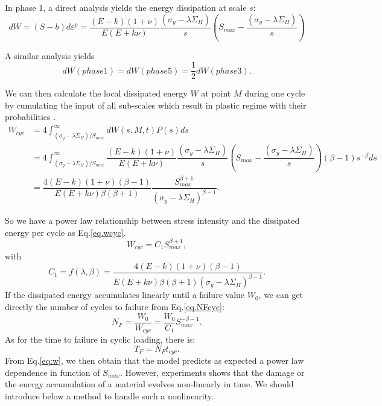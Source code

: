 \documentclass[3p,times,number,review]{elsarticle}
\begin{document}
In phase 1, a direct analysis yields the energy dissipation at scale $s$:
\begin{equation}dW=(S-b)d\varepsilon^p=\dfrac{(E-k)(1+\nu) }{E(E+k\nu)}\dfrac{ \left(\sigma_y-\lambda \Sigma_H\right)}{s}\left(S_{max}-\dfrac{ \left(\sigma_y-\lambda \Sigma_H\right)}{s}\right)
\label{dw}
\end{equation}

A similar analysis yields $$dW(phase 1)=dW(phase 5)=\dfrac{1}{2}dW(phase 3).$$

We can then calculate  the local dissipated energy $W$  at point $M$ during one cycle by cumulating the input of all sub-scales which result in plastic regime with their probabilities \cite{zepeng}.
\begin{equation}
\begin{split}
W_{cyc}&=4\int_{ \left(\sigma_y-\lambda \Sigma_H\right) /S_{max}}^{\infty}dW(s,M,t)P(s)ds
\\&=4\int_{ \left(\sigma_y-\lambda \Sigma_H\right) /S_{max}}^{\infty}\dfrac{(E-k)(1+\nu) }{E(E+k\nu)}\dfrac{ \left(\sigma_y-\lambda \Sigma_H\right)}{s}\left(S_{max}-\dfrac{ \left(\sigma_y-\lambda \Sigma_H\right)}{s}\right)\left( \beta-1\right) s^{-\beta}ds
\\&=\dfrac{4(E-k)(1+\nu)\left( \beta-1\right) }{ E(E+k\nu)\beta\left( \beta+1\right) }\dfrac{S_{max}^{\beta+1}}{ \left(\sigma_y-\lambda \Sigma_H\right)^{\beta-1}}.
\end{split}
\label{eq:w}
\end{equation}

So we have a power law relationship between stress intensity and the dissipated energy per cycle as Eq.\eqref{eq.wcyc}.
\begin{equation}
W_{cyc}=C_1S_{max}^{\beta+1},
\label{eq.wcyc}
\end{equation}
with 
$$C_1=f(\lambda,\beta)=\dfrac{4(E-k)(1+\nu)\left( \beta-1\right) }{ E(E+k\nu)\beta\left( \beta+1\right)\left(\sigma_y-\lambda \Sigma_H\right)^{\beta-1} }.$$
 If the dissipated energy accumulates linearly until a failure value $W_0$, we can get directly the number of cycles to failure from Eq.\eqref{eq.NFcyc}:
\begin{equation}
N_{F}=\dfrac{W_0}{W_{cyc}}=\dfrac{W_0}{C_1}S_{max}^{-\beta-1}.
\label{eq.NFcyc}
\end{equation}
As for the time to failure in cyclic loading, there is:
$$T_{F}=N_{F}t_{cyc}.$$
From Eq.\eqref{eq:w}, we then obtain that the model predicts as expected a power law dependence in function of $S_{max}$.
However, experiments shows that the damage or the energy accumulation of a material evolves non-linearly in time. We should introduce below a method to handle such a nonlinearity.
\end{document}
